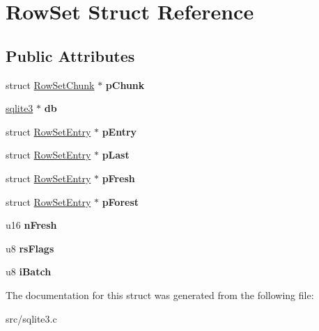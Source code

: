 \hypertarget{struct_row_set}{\section{Row\-Set Struct Reference}
\label{struct_row_set}
}
\subsection*{Public Attributes}
\begin{DoxyCompactItemize}
\item 
\hypertarget{struct_row_set_af064f9ec7b1ba820a3d53622bde9d42f}{struct \hyperlink{struct_row_set_chunk}{Row\-Set\-Chunk} $\ast$ {\bfseries p\-Chunk}}\label{struct_row_set_af064f9ec7b1ba820a3d53622bde9d42f}

\item 
\hypertarget{struct_row_set_a7da847a06c2f90025fbd89c57516c6f6}{\hyperlink{structsqlite3}{sqlite3} $\ast$ {\bfseries db}}\label{struct_row_set_a7da847a06c2f90025fbd89c57516c6f6}

\item 
\hypertarget{struct_row_set_a3eccaf69ad7863abae2541a7c0b94e1d}{struct \hyperlink{struct_row_set_entry}{Row\-Set\-Entry} $\ast$ {\bfseries p\-Entry}}\label{struct_row_set_a3eccaf69ad7863abae2541a7c0b94e1d}

\item 
\hypertarget{struct_row_set_a040c4b798e6f20d20aa99a45e93b2079}{struct \hyperlink{struct_row_set_entry}{Row\-Set\-Entry} $\ast$ {\bfseries p\-Last}}\label{struct_row_set_a040c4b798e6f20d20aa99a45e93b2079}

\item 
\hypertarget{struct_row_set_a7c4e95bd08ff77135068bb3987be5ca1}{struct \hyperlink{struct_row_set_entry}{Row\-Set\-Entry} $\ast$ {\bfseries p\-Fresh}}\label{struct_row_set_a7c4e95bd08ff77135068bb3987be5ca1}

\item 
\hypertarget{struct_row_set_abe7ab16fffbe5992f637d6a17c6342ff}{struct \hyperlink{struct_row_set_entry}{Row\-Set\-Entry} $\ast$ {\bfseries p\-Forest}}\label{struct_row_set_abe7ab16fffbe5992f637d6a17c6342ff}

\item 
\hypertarget{struct_row_set_a0ed2a47d6789a70081f3454ef2604e7f}{u16 {\bfseries n\-Fresh}}\label{struct_row_set_a0ed2a47d6789a70081f3454ef2604e7f}

\item 
\hypertarget{struct_row_set_af62438d96429ac10fcbddeb4f6bd9343}{u8 {\bfseries rs\-Flags}}\label{struct_row_set_af62438d96429ac10fcbddeb4f6bd9343}

\item 
\hypertarget{struct_row_set_af33d206290792936cb1ebbb8e03baf64}{u8 {\bfseries i\-Batch}}\label{struct_row_set_af33d206290792936cb1ebbb8e03baf64}

\end{DoxyCompactItemize}


The documentation for this struct was generated from the following file\-:\begin{DoxyCompactItemize}
\item 
src/sqlite3.\-c\end{DoxyCompactItemize}
